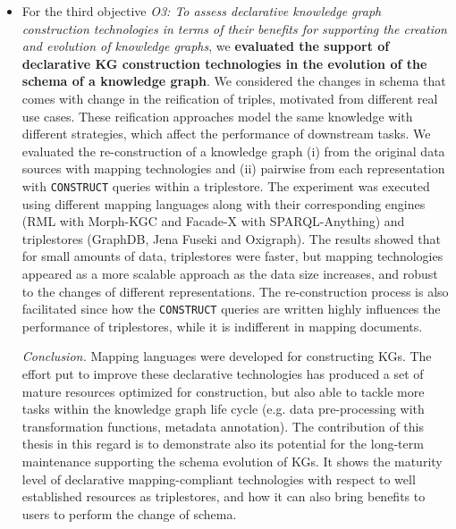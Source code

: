 \begin{itemize}
    \item For the third objective \textit{O3: To assess declarative knowledge graph construction technologies in terms of their benefits for supporting the creation and evolution of knowledge graphs}, we \textbf{evaluated the support of declarative KG construction technologies in the evolution of the schema of a knowledge graph}. We considered the changes in schema that comes with change in the reification of triples, motivated from different real use cases. These reification approaches model the same knowledge with different strategies, which affect the performance of downstream tasks. We evaluated the re-construction of a knowledge graph (i) from the original data sources with mapping technologies and (ii) pairwise from each representation with \texttt{CONSTRUCT} queries within a triplestore. The experiment was executed using different mapping languages along with their corresponding engines (RML with Morph-KGC and Facade-X with SPARQL-Anything) and triplestores (GraphDB, Jena Fuseki and Oxigraph). The results showed that for small amounts of data, triplestores were faster, but mapping technologies appeared as a more scalable approach as the data size increases, and robust to the changes of different representations. The re-construction process is also facilitated since how the \texttt{CONSTRUCT} queries are written highly influences the performance of triplestores, while it is indifferent in mapping documents. 

    \textit{Conclusion.} Mapping languages were developed for constructing KGs. The effort put  to improve these declarative technologies has produced a set of mature resources optimized for construction, but also able to tackle more tasks within the knowledge graph life cycle (e.g. data pre-processing with transformation functions, metadata annotation). The contribution of this thesis in this regard is to demonstrate also its potential for the long-term maintenance supporting the schema evolution of KGs. It shows the maturity level of declarative mapping-compliant technologies with respect to well established resources as triplestores, and how it can also bring benefits to users to perform the change of schema. 
\end{itemize}

